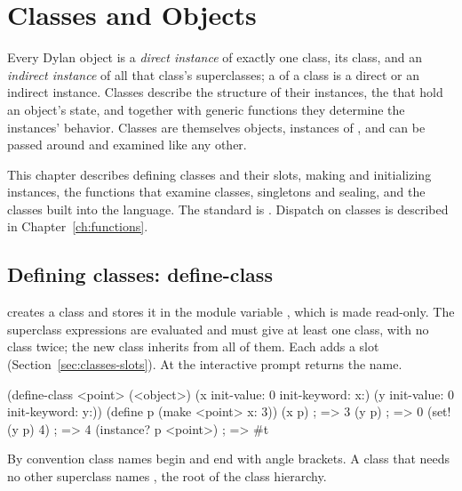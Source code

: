 \chapter{Classes and Objects}\label{ch:classes}

Every Dylan object is a \emph{direct instance} of exactly one class, its
class, and an \emph{indirect instance} of all that class's superclasses; a
 of a class is a direct or an indirect instance.
Classes describe the structure of their instances, the  that
hold an object's state, and together with generic functions they determine
the instances' behavior. Classes are themselves objects, instances of
, and can be passed around and examined like any other.

This chapter describes defining classes and their slots, making and
initializing instances, the functions that examine classes, singletons and
sealing, and the classes built into the language. The standard is
. Dispatch on classes is described in
Chapter~\ref{ch:functions}.

\section{Defining classes: define-class}\label{sec:classes-define-class}

\begin{quote}
\end{quote}

\noindent {} creates a class and stores it in the module
variable , which is made read-only. The superclass expressions
are evaluated and must give at least one class, with no class twice; the
new class inherits from all of them. Each  adds a slot
(Section~\ref{sec:classes-slots}). At the interactive prompt
 returns the name.

\begin{dylan}
(define-class <point> (<object>)
  (x init-value: 0 init-keyword: x:)
  (y init-value: 0 init-keyword: y:))
(define p (make <point> x: 3))
(x p)                          ; => 3
(y p)                          ; => 0
(set! (y p) 4)                 ; => 4
(instance? p <point>)          ; => #t
\end{dylan}

\noindent By convention class names begin and end with angle brackets. A
class that needs no other superclass names , the root of
the class hierarchy.

